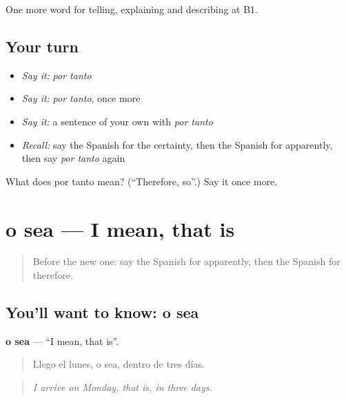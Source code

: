 \begin{grammarlens}[title={What you've built}]
One more word for telling, explaining and describing at B1.
\end{grammarlens}

\subsection*{Your turn}
\begin{itemize}
\raggedright
  \item \emph{Say it:} \emph{por tanto}
  \item \emph{Say it:} \emph{por tanto}, once more
  \item \emph{Say it:} a sentence of your own with \emph{por tanto}
  \item \emph{Recall:} say the Spanish for the certainty, then the Spanish for apparently, then say \emph{por tanto} again
\end{itemize}

\begin{tcolorbox}[breakable,colback=teal!4,colframe=teal!35!black,title={Before you move on}]
What does por tanto mean? (\textquotedblleft{}Therefore, so\textquotedblright{}.) Say it once more.
\end{tcolorbox}
\section[o sea]{o sea — I mean, that is}

\label{lesson:ES-C588-o-sea}



\begin{quote}
Before the new one: say the Spanish for apparently, then the Spanish for therefore.
\end{quote}

\subsection*{You'll want to know: o sea}
\textbf{o sea} — \textquotedblleft{}I mean, that is\textquotedblright{}.

\begin{quote}
Llego el lunes, o sea, dentro de tres días.
\end{quote}

\begin{quote}
\emph{I arrive on Monday, that is, in three days.}
\end{quote}

